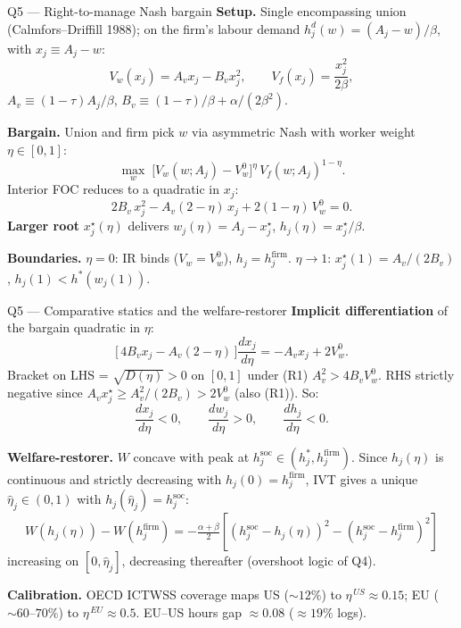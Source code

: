 \documentclass{beamer}
\begin{document}
\begin{frame}{Q5 --- Right-to-manage Nash bargain}
\textbf{Setup.} Single encompassing union (Calmfors--Driffill 1988); on the firm's labour demand $h^d_j(w)\!=\!(A_j-w)/\beta$, with $x_j\!\equiv\!A_j-w$:
\[
V_w(x_j)=A_v x_j-B_v x_j^{2},\qquad V_f(x_j)=\frac{x_j^{2}}{2\beta},
\]
$A_v\!\equiv\!(1\!-\!\tau)A_j/\beta$, $B_v\!\equiv\!(1\!-\!\tau)/\beta+\alpha/(2\beta^{2})$.

\textbf{Bargain.} Union and firm pick $w$ via asymmetric Nash with worker weight $\eta\!\in\![0,1]$:
\[
\max_{w}\;\bigl[V_w(w;A_j)-V_w^{0}\bigr]^{\eta}\,V_f(w;A_j)^{1-\eta}.
\]
Interior FOC reduces to a quadratic in $x_j$:
\[
2B_v\,x_j^{2}-A_v(2-\eta)\,x_j+2(1-\eta)\,V_w^{0}=0.
\]
\textbf{Larger root} $x_j^{\star}(\eta)$ delivers $w_j(\eta)=A_j-x_j^{\star}$, $h_j(\eta)=x_j^{\star}/\beta$.

\vspace{0.3em}
\textbf{Boundaries.} $\eta\!=\!0$: IR binds ($V_w\!=\!V_w^0$), $h_j\!=\!h^{\mathrm{firm}}_j$. $\eta\!\to\!1$: $x^\star_j(1)\!=\!A_v/(2B_v)$, $h_j(1)\!<\!h^*(w_j(1))$.
\end{frame}

\begin{frame}{Q5 --- Comparative statics and the welfare-restorer}
\textbf{Implicit differentiation} of the bargain quadratic in $\eta$:
\[
\bigl[\,4B_v x_j-A_v(2-\eta)\,\bigr]\frac{dx_j}{d\eta}=-A_v x_j+2V_w^{0}.
\]
Bracket on LHS = $\sqrt{D(\eta)}\!>\!0$ on $[0,1]$ under (R1) $A_v^{2}\!>\!4B_vV_w^0$.
RHS strictly negative since $A_v x^\star_j\!\ge\!A_v^{2}/(2B_v)\!>\!2V_w^0$ (also (R1)). So:
\[
\frac{dx_j}{d\eta}<0,\qquad \frac{dw_j}{d\eta}>0,\qquad \frac{dh_j}{d\eta}<0.
\]

\textbf{Welfare-restorer.} $W$ concave with peak at $h^{\mathrm{soc}}_j\!\in\!(h^*_j,h^{\mathrm{firm}}_j)$. Since $h_j(\eta)$ is continuous and strictly decreasing with $h_j(0)\!=\!h^{\mathrm{firm}}_j$, IVT gives a unique $\hat\eta_j\!\in\!(0,1)$ with $h_j(\hat\eta_j)\!=\!h^{\mathrm{soc}}_j$:
\[
W(h_j(\eta))-W(h^{\mathrm{firm}}_j)=-\tfrac{\alpha+\beta}{2}\!\left[(h^{\mathrm{soc}}_j\!-\!h_j(\eta))^{2}-(h^{\mathrm{soc}}_j\!-\!h^{\mathrm{firm}}_j)^{2}\right]
\]
increasing on $[0,\hat\eta_j]$, decreasing thereafter (overshoot logic of Q4).

\vspace{0.3em}
\textbf{Calibration.} OECD ICTWSS coverage maps US ($\sim\!12\%$) to $\eta^{\,US}\!\approx\!0.15$; EU ($\sim\!60$--$70\%$) to $\eta^{\,EU}\!\approx\!0.5$. EU--US hours gap $\approx\!0.08$ ($\approx\!19\%$ logs).
\end{frame}
\end{document}
